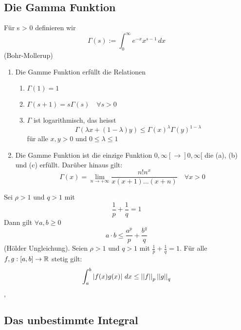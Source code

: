 \subsection{Die Gamma Funktion}
 Für s > 0 definieren wir
\[ \Gamma(s) := \int_{0}^{\infty} e^{-x}x^{s-1} \,dx\]
(Bohr-Mollerup)
\begin{enumerate}
    \item [1] Die Gamme Funktion erfüllt die Relationen
    \begin{enumerate}
        \item [(a)] \( \Gamma(1) = 1\)
        \item [(b)] \(\Gamma(s+1) = s\Gamma(s) \quad \forall s > 0 \)
        \item [(c)] \( \Gamma\) ist logarithmisch, das heisst
        \[\Gamma( \lambda x + (1 - \lambda)y) \leq \Gamma(x)^{\lambda}\Gamma(y)^{1-\lambda}\]
        für alle \(x,y > 0\) und \(0 \leq \lambda \leq 1\)
    \end{enumerate}
    \item [2] Die Gamme Funktion ist die einzige Funktion \( 0, \infty[ \rightarrow ]0, \infty [\) die (a), (b) und (c) erfüllt. Darüber hinaus gilt:
    \[\Gamma(x) = \lim\limits_{n \rightarrow +\infty} \frac{n!n^x}{x(x+1) \dots (x+n)} \quad \forall x > 0\] 
\end{enumerate}
 Sei \( \rho > 1\) und \(q > 1\) mit
\[ \frac{1}{p} + \frac{1}{q} = 1\]
Dann gilt \(\forall a,b \geq 0 \)
\[ a \cdot b \leq \frac{a^p}{p} + \frac{b^q}{q}\]
(Hölder Ungleichung). Seien \( \rho > 1\) und \( q > 1\) mit \( \frac{1}{p} + \frac{1}{q} = 1\). Für alle \(f,g : [a,b] \rightarrow \mathbb{R} \) stetig gilt:
\[ \int_{a}^{b} \left\lvert f(x)g(x) \right\rvert \,dx \leq \left\lvert \left\lvert f \right\rvert \right\rvert_p \left\lvert \left\lvert g \right\rvert \right\rvert_q\]
\sep
\subsection{Das unbestimmte Integral}
